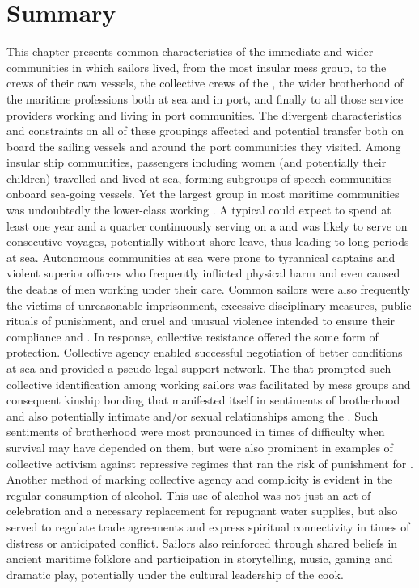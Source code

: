 \section{{Summary}}%

This chapter presents common characteristics of the immediate and wider communities in which sailors lived, from the most insular mess group, to the crews of their own vessels, the collective crews of the , the wider brotherhood of the maritime professions both at sea and in port, and finally to all those service providers working and living in port communities. The divergent characteristics and constraints on all of these groupings affected  and potential transfer both on board the sailing vessels and around the port communities they visited. Among insular ship communities, passengers including women (and potentially their children) travelled and lived at sea, forming subgroups of speech communities onboard sea-going vessels. Yet the largest group in most maritime communities was undoubtedly the lower-class working . A typical  could expect to spend at least one year and a quarter continuously serving on a   and was likely to serve on consecutive voyages, potentially without shore leave, thus leading to long periods at sea. Autonomous communities at sea were prone to tyrannical captains and violent superior officers who frequently inflicted physical harm and even caused the deaths of men working under their care. Common sailors were also frequently the victims of unreasonable imprisonment, excessive disciplinary measures, public rituals of punishment, and cruel and unusual violence intended to ensure their compliance and . In response, collective resistance offered the  some form of protection. Collective agency enabled successful negotiation of better conditions at sea and provided a pseudo-legal support network. The  that prompted such collective identification among working sailors was facilitated by mess groups and consequent kinship bonding that manifested itself in sentiments of brotherhood and also potentially intimate and/or sexual relationships among the . Such sentiments of brotherhood were most pronounced in times of difficulty when survival may have depended on them, but were also prominent in examples of collective activism against repressive regimes that ran the risk of punishment for . Another method of marking collective agency and complicity is evident in the regular consumption of alcohol. This use of alcohol was not just an act of celebration and a necessary replacement for repugnant water supplies, but also served to regulate trade agreements and express spiritual connectivity in times of distress or anticipated conflict. Sailors also reinforced  through shared beliefs in ancient maritime folklore and participation in storytelling, music, gaming and dramatic play, potentially under the cultural leadership of the cook. 

